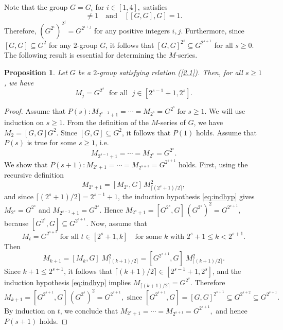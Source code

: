 \documentclass[a4paper,11pt]{article}
\numberwithin{equation}{section}
\newtheorem{prop}{Proposition}[section]
\begin{document}
\noindent Note that the group $G=G_i$ for $i\in [1,4],$ satisfies
\begin{equation}
[G,G] \neq 1 \quad \text{and}\quad [[G,G],G]=1. \label{2.1}
\end{equation}
Therefore, $(G^{2^i})^{2^j}= G^{2^{i+j}}$ for any positive integers $i,j$. Furthermore, since  $[G,G]\subseteq G^2$ for any $2$-group $G$, it follows that  $[G,G]^{2^s}\subseteq G^{2^{s+1}}$ for all $s\geq 0.$ The following result is essential for determining the $M$-series.

\begin{prop}\label{Ind} 
Let $G$ be a $2$-group satisfying relation \emph{(\ref{2.1})}. Then, for all $s \geq 1$, we have 
\begin{equation*}\label{equationinduction}
M_j=G^{2^{s}} \;\text{ for all }\; j \in [2^{s-1}+1, 2^s].
\end{equation*}
\end{prop}
\begin{proof} Assume that
$P(s) :  M_{2^{s-1}+1}= \cdots =M_{2^{s}}=G^{2^{s}} \; \text{for} \; s \ge 1.$ We will use induction on $s \ge 1$. From the definition of the $M$-series of $G$, we have $M_2=[G,G]G^2$. Since $[G,G]\subseteq G^2$, it follows that $P(1)$ holds. Assume that $P(s)$ is true for some $s\ge 1$, i.e.
\begin{equation}\label{eq:indhyp}
M_{2^{s-1}+1}=\cdots =M_{2^{s}}=G^{2^{s}}.
\end{equation}
We show that $P(s+1): M_{2^{s}+1}=\cdots=M_{2^{s+1}}=G^{2^{s+1}}$ holds. First, using the recursive definition 
\[
M_{2^s+1}
=[M_{2^s},G]\, M_{\lceil (2^s+1)/2\rceil}^{2},
\]
 and since $\lceil (2^{s}+1)/2\rceil=2^{s-1}+1$, the induction hypothesis
\eqref{eq:indhyp} gives $M_{2^{s}}=G^{2^{s}}$ and $M_{2^{s-1}+1}=G^{2^{s}}$. Hence
$M_{2^{s}+1}
=[G^{2^{s}},G]\,(G^{2^{s}})^{2}
=G^{2^{s+1}},$ because 
$[G^{2^{s}},G]\subseteq G^{2^{s+1}}$. Now, assume that $$M_t=G^{2^{s+1}} \text{ for all } t \in [2^{s}+1, k]\quad \text{for some $k$ with $2^{s}+1\le k<2^{s+1}$}.$$ Then \[
M_{k+1}=[M_k,G]\; M_{\lceil (k+1)/2\rceil}^{2} = [G^{2^{s+1}},G]\; M_{\lceil (k+1)/2\rceil}^{2}.
\]
Since $k+1\le 2^{s+1}$, it follows that $\lceil (k+1)/2\rceil\in[2^{s-1}+1,2^{s}]$, and the induction hypothesis \eqref{eq:indhyp} implies $M_{\lceil (k+1)/2\rceil}=G^{2^{s}}$. Therefore
\[
M_{k+1} = [G^{2^{s+1}},G]\,(G^{2^{s}})^2 = G^{2^{s+1}}, \text{ since $[G^{2^{s+1}},G]=[G,G]^{2^{s+1}}\subseteq G^{2^{s+2}}\subseteq G^{2^{s+1}}.$}
\] By induction on $t$, we conclude that 
$M_{2^{s}+1}=\cdots=M_{2^{s+1}}=G^{2^{s+1}},$ and hence $P(s+1)$ holds.
\end{proof}
\end{document}
